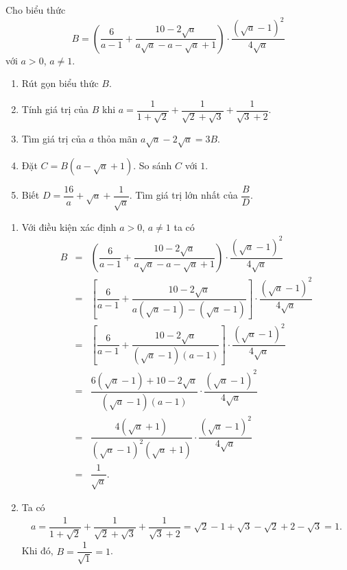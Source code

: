 \begin{bt}%
	Cho biểu thức $$B=\left(\dfrac{6}{a-1} + \dfrac{10-2\sqrt{a}}{a\sqrt{a}-a-\sqrt{a}+1}\right) \cdot \dfrac{\left(\sqrt{a}-1\right)^2}{4\sqrt{a}}$$ với $a>0$, $a\neq 1$.
	\begin{enumerate}
		\item Rút gọn biểu thức $B$.
		\item Tính giá trị của $B$ khi $a=\dfrac{1}{1+\sqrt{2}} + \dfrac{1}{\sqrt{2}+\sqrt{3}} + \dfrac{1}{\sqrt{3}+2}$.
		\item Tìm giá trị của $a$ thỏa mãn $a\sqrt{a}-2\sqrt{a}=3B$.
		\item Đặt $C=B\left(a-\sqrt{a}+1\right)$. So sánh $C$ với $1$.
		\item Biết $D=\dfrac{16}{a}+\sqrt{a}+\dfrac{1}{\sqrt{a}}$. Tìm giá trị lớn nhất của $\dfrac{B}{D}$.
	\end{enumerate}
	\loigiai
	{
		\begin{enumerate}
			\item Với điều kiện xác định $a>0$, $a \neq 1$ ta có
			\allowdisplaybreaks
			\begin{eqnarray*}
				B &=& \left(\dfrac{6}{a-1} + \dfrac{10-2\sqrt{a}}{a\sqrt{a}-a-\sqrt{a}+1}\right) \cdot \dfrac{\left(\sqrt{a}-1\right)^2}{4\sqrt{a}}\\
				&=& \left[\dfrac{6}{a-1} + \dfrac{10-2\sqrt{a}}{a\left(\sqrt{a}-1\right) - \left(\sqrt{a}-1\right)}\right] \cdot \dfrac{\left(\sqrt{a}-1\right)^2}{4\sqrt{a}}\\
				&=& \left[\dfrac{6}{a-1} + \dfrac{10-2\sqrt{a}}{\left(\sqrt{a}-1\right)\left(a-1\right)}\right] \cdot \dfrac{\left(\sqrt{a}-1\right)^2}{4\sqrt{a}}\\
				&=& \dfrac{6\left(\sqrt{a}-1\right)+10-2\sqrt{a}}{\left(\sqrt{a}-1\right)(a-1)} \cdot \dfrac{\left(\sqrt{a}-1\right)^2}{4\sqrt{a}}\\
				&=& \dfrac{4\left(\sqrt{a}+1\right)}{\left(\sqrt{a}-1\right)^2\left(\sqrt{a}+1\right)} \cdot \dfrac{\left(\sqrt{a}-1\right)^2}{4\sqrt{a}}\\
				&=& \dfrac{1}{\sqrt{a}}.
			\end{eqnarray*}
			\item Ta có
			\allowdisplaybreaks
			\begin{eqnarray*}
				a = \dfrac{1}{1+\sqrt{2}} + \dfrac{1}{\sqrt{2}+\sqrt{3}} + \dfrac{1}{\sqrt{3}+2} = \sqrt{2}-1 + \sqrt{3}-\sqrt{2} + 2-\sqrt{3} = 1.
			\end{eqnarray*}
			Khi đó, $B=\dfrac{1}{\sqrt{1}} = 1$.

\end{enumerate}}
\end{bt}
